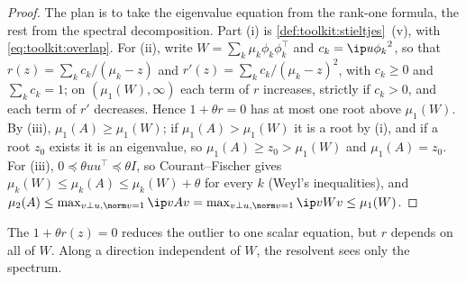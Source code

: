 \begin{refsection}

\begin{proof}
The plan is to take the eigenvalue equation from the rank-one formula, the rest from the spectral decomposition. Part (i) is \cref{def:toolkit:stieltjes}~(v), with \eqref{eq:toolkit:overlap}. For (ii), write $W=\sum_k\mu_k\phi_k\phi_k^\top$ and $c_k=\ip u{\phi_k}^2$, so that $r(z)=\sum_kc_k/(\mu_k-z)$ and $r'(z)=\sum_kc_k/(\mu_k-z)^2$, with $c_k\ge0$ and $\sum_kc_k=1$; on $(\mu_1(W),\infty)$ each term of $r$ increases, strictly if $c_k>0$, and each term of $r'$ decreases. Hence $1+\theta r=0$ has at most one root above $\mu_1(W)$. By (iii), $\mu_1(A)\ge\mu_1(W)$; if $\mu_1(A)>\mu_1(W)$ it is a root by (i), and if a root $z_0$ exists it is an eigenvalue, so $\mu_1(A)\ge z_0>\mu_1(W)$ and $\mu_1(A)=z_0$. For (iii), $0\preceq\theta uu^\top\preceq\theta I$, so Courant--Fischer gives $\mu_k(W)\le\mu_k(A)\le\mu_k(W)+\theta$ for every $k$ (Weyl's inequalities), and $\mu_2(A)\le\max_{v\perp u,\norm v=1}\ip v{Av}=\max_{v\perp u,\norm v=1}\ip v{Wv}\le\mu_1(W)$.
\end{proof}

The  $1+\theta r(z)=0$ reduces the outlier to one scalar equation, but $r$ depends on all of $W$. Along a direction independent of $W$, the resolvent sees only the spectrum.


\end{refsection}
